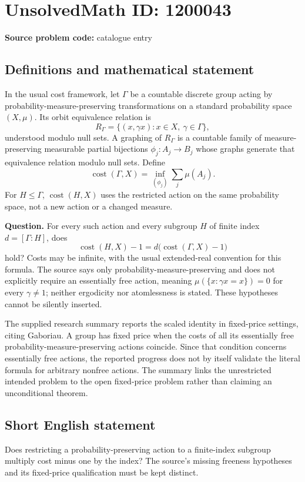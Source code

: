 \documentclass[11pt]{article}
\begin{document}
\section*{UnsolvedMath ID: 1200043}
\textbf{Source problem code:} catalogue entry
\subsection{Definitions and mathematical statement}
In the usual cost framework, let $\Gamma$ be a countable discrete group acting by probability-measure-preserving transformations on a standard probability space $(X,\mu)$. Its orbit equivalence relation is
\[
R_{\Gamma}=\{(x,\gamma x):x\in X,\ \gamma\in\Gamma\},
\]
understood modulo null sets. A graphing of $R_{\Gamma}$ is a countable family of measure-preserving measurable partial bijections $\phi_j:A_j\to B_j$ whose graphs generate that equivalence relation modulo null sets. Define
\[
\operatorname{cost}(\Gamma,X)=\inf_{(\phi_j)}\sum_j\mu(A_j).
\]
For $H\leq\Gamma$, $\operatorname{cost}(H,X)$ uses the restricted action on the same probability space, not a new action or a changed measure.

\textbf{Question.} For every such action and every subgroup $H$ of finite index $d=[\Gamma:H]$, does
\[
\operatorname{cost}(H,X)-1
=d\big(\operatorname{cost}(\Gamma,X)-1\big)
\]
hold? Costs may be infinite, with the usual extended-real convention for this formula. The source says only probability-measure-preserving and does not explicitly require an essentially free action, meaning $\mu(\{x:\gamma x=x\})=0$ for every $\gamma\ne1$; neither ergodicity nor atomlessness is stated. These hypotheses cannot be silently inserted.

The supplied research summary reports the scaled identity in fixed-price settings, citing Gaboriau. A group has fixed price when the costs of all its essentially free probability-measure-preserving actions coincide. Since that condition concerns essentially free actions, the reported progress does not by itself validate the literal formula for arbitrary nonfree actions. The summary links the unrestricted intended problem to the open fixed-price problem rather than claiming an unconditional theorem.
\subsection{Short English statement}
Does restricting a probability-preserving action to a finite-index subgroup multiply cost minus one by the index? The source’s missing freeness hypotheses and its fixed-price qualification must be kept distinct.
\end{document}
